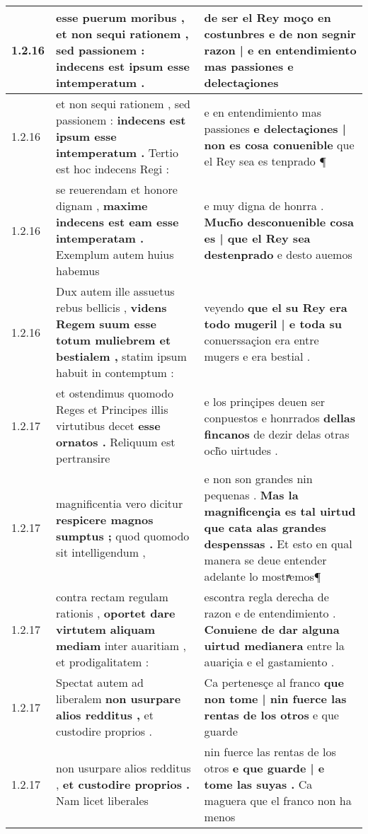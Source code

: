 \begin{tabular}{|p{1cm}|p{6.5cm}|p{6.5cm}|}
1.2.16 & esse puerum moribus , \textbf{ et non sequi rationem , sed passionem : } indecens est ipsum esse intemperatum . & de ser el Rey moço en costunbres \textbf{ e de non segnir razon | e en entendimiento mas passiones } e delectaçiones \\\hline
1.2.16 & et non sequi rationem , sed passionem : \textbf{ indecens est ipsum esse intemperatum . } Tertio est hoc indecens Regi : & e en entendimiento mas passiones \textbf{ e delectaçiones | non es cosa conuenible } que el Rey sea es tenprado ¶ \\\hline
1.2.16 & se reuerendam et honore dignam , \textbf{ maxime indecens est eam esse intemperatam . } Exemplum autem huius habemus & e muy digna de honrra . \textbf{ Much̃o desconuenible cosa es | que el Rey sea destenprado } e desto auemos \\\hline
1.2.16 & Dux autem ille assuetus rebus bellicis , \textbf{ videns Regem suum esse totum muliebrem et bestialem , } statim ipsum habuit in contemptum : & veyendo \textbf{ que el su Rey era todo mugeril | e toda su } conuerssaçion era entre mugers e era bestial . \\\hline
1.2.17 & et ostendimus quomodo Reges et Principes illis virtutibus decet \textbf{ esse ornatos . } Reliquum est pertransire & e los prinçipes deuen ser conpuestos e honrrados \textbf{ dellas fincanos } de dezir delas otras och̃o uirtudes . \\\hline
1.2.17 & magnificentia vero dicitur \textbf{ respicere magnos sumptus ; } quod quomodo sit intelligendum , & e non son grandes nin pequenas . \textbf{ Mas la magnificençia es tal uirtud que cata alas grandes despenssas . } Et esto en qual manera se deue entender adelante lo mostrͣemos¶ \\\hline
1.2.17 & contra rectam regulam rationis , \textbf{ oportet dare virtutem aliquam mediam } inter auaritiam , et prodigalitatem : & escontra regla derecha de razon e de entendimiento . \textbf{ Conuiene de dar alguna uirtud medianera } entre la auariçia e el gastamiento . \\\hline
1.2.17 & Spectat autem ad liberalem \textbf{ non usurpare alios redditus , } et custodire proprios . & Ca pertenesçe al franco \textbf{ que non tome | nin fuerce las rentas de los otros } e que guarde \\\hline
1.2.17 & non usurpare alios redditus , \textbf{ et custodire proprios . } Nam licet liberales & nin fuerce las rentas de los otros \textbf{ e que guarde | e tome las suyas . } Ca maguera que el franco non ha menos \\\hline

\end{tabular}
